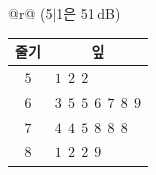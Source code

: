 {\renewcommand{\arraystretch}{1.25}\small
\begin{tabular}{@{}r@{}}
{\footnotesize (5$|$1은 51\,dB)} \\[1pt]
\begin{tabular}{c|@{\ \ }l}
\hline
줄기 & \multicolumn{1}{c}{잎} \\ \hline
$5$ & $1\ \ 2\ \ 2$ \\
$6$ & $3\ \ 5\ \ 5\ \ 6\ \ 7\ \ 8\ \ 9$ \\
$7$ & $4\ \ 4\ \ 5\ \ 8\ \ 8\ \ 8$ \\
$8$ & $1\ \ 2\ \ 2\ \ 9$ \\ \hline
\end{tabular}
\end{tabular}}
